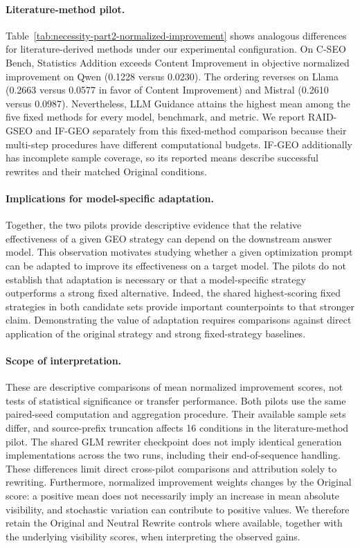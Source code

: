 \paragraph{Literature-method pilot.}
Table~\ref{tab:necessity-part2-normalized-improvement}
shows analogous differences for literature-derived methods under our
experimental configuration. On C-SEO Bench, Statistics Addition exceeds
Content Improvement in objective normalized improvement on Qwen
(0.1228 versus 0.0230). The ordering reverses on Llama
(0.2663 versus 0.0577 in favor of Content Improvement) and Mistral
(0.2610 versus 0.0987). Nevertheless, LLM Guidance attains the highest
mean among the five fixed methods for every model, benchmark, and metric.
We report RAID-GSEO and IF-GEO separately from this fixed-method comparison
because their multi-step procedures have different computational budgets.
IF-GEO additionally has incomplete sample coverage, so its reported means
describe successful rewrites and their matched Original conditions.

\paragraph{Implications for model-specific adaptation.}
Together, the two pilots provide descriptive evidence that the relative
effectiveness of a given GEO strategy can depend on the downstream answer
model. This observation motivates studying whether a given optimization
prompt can be adapted to improve its effectiveness on a target model.
The pilots do not establish that adaptation is necessary or that a
model-specific strategy outperforms a strong fixed alternative.
Indeed, the shared highest-scoring fixed strategies in both candidate sets
provide important counterpoints to that stronger claim. Demonstrating the
value of adaptation requires comparisons against direct application of
the original strategy and strong fixed-strategy baselines.

\paragraph{Scope of interpretation.}
These are descriptive comparisons of mean normalized improvement scores,
not tests of statistical significance or transfer performance. Both pilots
use the same paired-seed computation and aggregation procedure. Their
available sample sets differ, and source-prefix truncation affects
16 conditions in the literature-method pilot. The shared GLM rewriter
checkpoint does not imply identical generation implementations across
the two runs, including their end-of-sequence handling. These differences
limit direct cross-pilot comparisons and attribution solely to rewriting.
Furthermore, normalized improvement weights changes by the Original score:
a positive mean does not necessarily imply an increase in mean absolute
visibility, and stochastic variation can contribute to positive values.
We therefore retain the Original and Neutral Rewrite controls where
available, together with the underlying visibility scores, when interpreting
the observed gains.

